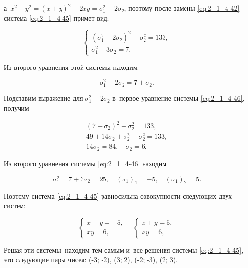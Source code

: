 \noindent
а~$x^{2} + y^{2} = (x + y)^{2} - 2xy = \sigma_{1}^{2} - 2\sigma_{2}$,
поэтому после замены \eqref{eq:2_1_4-42} система \eqref{eq:2_1_4-45} примет вид:

\begin{equation}\label{eq:2_1_4-46}
\begin{cases}
(\sigma_{1}^{2} - 2\sigma_{2})^{2} - \sigma_{2}^{2} = 133, \\
\sigma_{1}^{2} - 3\sigma_{2} = 7.
\end{cases}
\end{equation}

Из второго уравнения этой системы находим

\begin{equation*}
\sigma_{1}^{2} - 2\sigma_{2} = 7 + \sigma_{2}.
\end{equation*}

Подставим выражение для $\sigma_{1}^{2} - 2\sigma_{2}$ в~первое уравнение
системы \eqref{eq:2_1_4-46}, получим

\begin{gather*}
(7 + \sigma_{2})^{2} - \sigma_{2}^{2} = 133, \\
49 + 14\sigma_{2} + \sigma_{2}^{2} - \sigma_{2}^{2} = 133, \\
14\sigma_{2} = 84, \quad \sigma_{2} = 6.
\end{gather*}

Из второго уравнения системы \eqref{eq:2_1_4-46} находим

\begin{equation*}
\sigma_{1}^{2} = 7 + 3\sigma_{2} = 25,
\quad
(\sigma_{1})_{1} = -5,
\quad
(\sigma_{1})_{2} = 5.
\end{equation*}

Поэтому система \eqref{eq:2_1_4-45} равносильна совокупности следующих
двух систем:

\begin{equation*}
\begin{cases}
x + y = -5, \\
xy = 6,
\end{cases}
\quad
\begin{cases}
x + y = 5, \\
xy = 6,
\end{cases}
\end{equation*}

Решая эти системы, находим тем самым и~все решения системы \eqref{eq:2_1_4-45},
это следующие пары чисел:
(-3; -2), (3; 2), (-2; -3), (2; 3).

